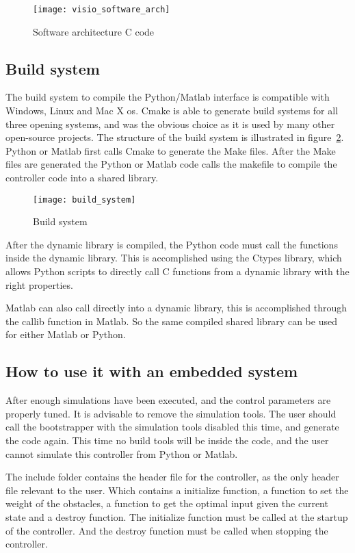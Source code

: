 	\begin{figure}[H]
		\centering
		\texttt{[image: visio\_software\_arch]}
		\caption{Software architecture C code}
		\label{fig:visio software arch}
	\end{figure}

\subsection{Build system}
The build system to compile the Python/Matlab interface is compatible with Windows, Linux and Mac X os. Cmake is able to generate build systems for all three opening systems, and was the obvious choice as it is used by many other open-source projects. The structure of the build system is illustrated in figure~\ref{fig:build system}. Python or Matlab first calls Cmake to generate the Make files. After the Make files are generated the Python or Matlab code calls the makefile to compile the controller code into a shared library.

\begin{figure}[H]
	\centering
	\texttt{[image: build\_system]}
	\caption{Build system}
	\label{fig:build system}
\end{figure}

After the dynamic library is compiled, the Python code must call the functions inside the dynamic library. This is accomplished using the Ctypes library, which allows Python scripts to directly call C functions from a dynamic library with the right properties.

Matlab can also call directly into a dynamic library, this is accomplished through the callib function in Matlab. So the same compiled shared library can be used for either Matlab or Python.

\subsection{How to use it with an embedded system}
After enough simulations have been executed, and the control parameters are properly tuned. It is advisable to remove the simulation tools. The user should call the bootstrapper with the simulation tools disabled this time, and generate the code again. This time no build tools will be inside the code, and the user cannot simulate this controller from Python or Matlab.

The include folder contains the header file for the controller, as the only header file relevant to the user. Which contains a initialize function, a function to set the weight of the obstacles, a function to get the optimal input given the current state and a destroy function. The initialize function must be called at the startup of the controller. And the destroy function must be called when stopping the controller.

